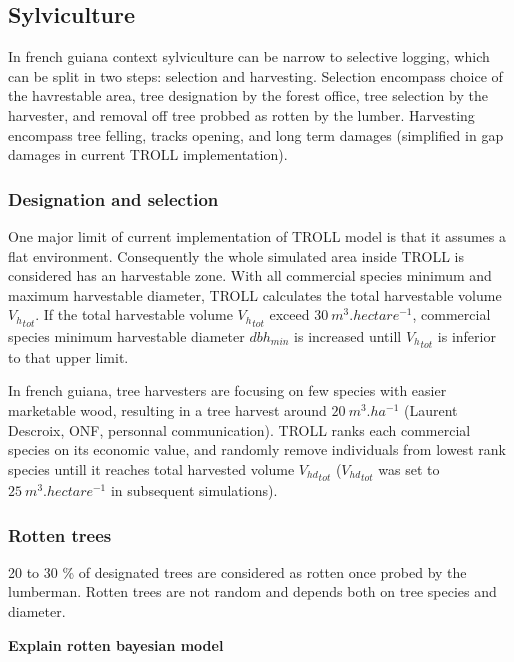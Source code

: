 \documentclass[12pt,]{article}
\theoremstyle{definition}
\theoremstyle{definition}
\theoremstyle{remark}
\begin{document}
\subsection{Sylviculture}\label{sylviculture}

In french guiana context sylviculture can be narrow to selective
logging, which can be split in two steps: selection and harvesting.
Selection encompass choice of the havrestable area, tree designation by
the forest office, tree selection by the harvester, and removal off tree
probbed as rotten by the lumber. Harvesting encompass tree felling,
tracks opening, and long term damages (simplified in gap damages in
current TROLL implementation).

\subsubsection{Designation and
selection}\label{designation-and-selection}

One major limit of current implementation of TROLL model is that it
assumes a flat environment. Consequently the whole simulated area inside
TROLL is considered has an harvestable zone. With all commercial species
minimum and maximum harvestable diameter, TROLL calculates the total
harvestable volume \({V_h}_{tot}\). If the total harvestable volume
\({V_h}_{tot}\) exceed \(30~m^3.hectare^{-1}\), commercial species
minimum harvestable diameter \(dbh_{min}\) is increased untill
\({V_h}_{tot}\) is inferior to that upper limit.

In french guiana, tree harvesters are focusing on few species with
easier marketable wood, resulting in a tree harvest around
\(20~m^3.ha^{-1}\) (Laurent Descroix, ONF, personnal communication).
TROLL ranks each commercial species on its economic value, and randomly
remove individuals from lowest rank species untill it reaches total
harvested volume \({V_{hd}}_{tot}\) (\({V_{hd}}_{tot}\) was set to
\(25~m^3.hectare^{-1}\) in subsequent simulations).

\subsubsection{Rotten trees}\label{rotten-trees}

20 to 30 \% of designated trees are considered as rotten once probed by
the lumberman. Rotten trees are not random and depends both on tree
species and diameter.

\textbf{Explain rotten bayesian model}
\end{document}
